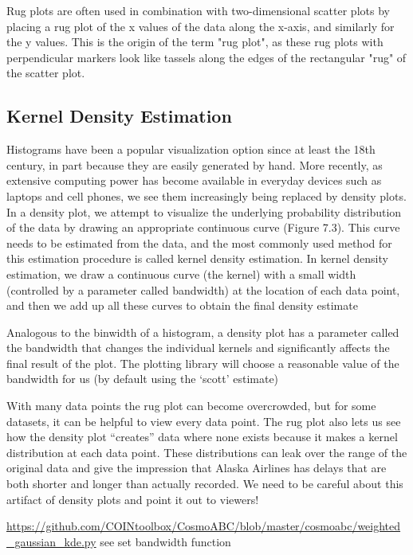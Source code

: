 Rug plots are often used in combination with two-dimensional scatter plots by placing a rug plot of the x values of the data along the x-axis, and similarly for the y values. This is the origin of the term "rug plot", as these rug plots with perpendicular markers look like tassels along the edges of the rectangular "rug" of the scatter plot.

\subsection{Kernel Density Estimation}\label{sec:kde}

Histograms have been a popular visualization option since at least the 18th century, in part because they are easily generated by hand. More recently, as extensive computing power has become available in everyday devices such as laptops and cell phones, we see them increasingly being replaced by density plots. In a density plot, we attempt to visualize the underlying probability distribution of the data by drawing an appropriate continuous curve (Figure 7.3). This curve needs to be estimated from the data, and the most commonly used method for this estimation procedure is called kernel density estimation. In kernel density estimation, we draw a continuous curve (the kernel) with a small width (controlled by a parameter called bandwidth) at the location of each data point, and then we add up all these curves to obtain the final density estimate

Analogous to the binwidth of a histogram, a density plot has a parameter called the bandwidth that changes the individual kernels and significantly affects the final result of the plot. The plotting library will choose a reasonable value of the bandwidth for us (by default using the ‘scott’ estimate)

With many data points the rug plot can become overcrowded, but for some datasets, it can be helpful to view every data point. The rug plot also lets us see how the density plot “creates” data where none exists because it makes a kernel distribution at each data point. These distributions can leak over the range of the original data and give the impression that Alaska Airlines has delays that are both shorter and longer than actually recorded. We need to be careful about this artifact of density plots and point it out to viewers!


\url{https://github.com/COINtoolbox/CosmoABC/blob/master/cosmoabc/weighted_gaussian_kde.py} see set bandwidth function 